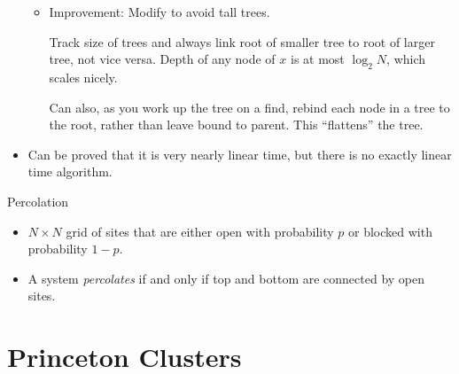 \documentclass[12pt]{article}
\theoremstyle{plain}
\theoremstyle{definition}
\theoremstyle{remark}
\begin{document}
\begin{itemize}
\begin{itemize}
      \item Improvement:
        Modify to avoid tall trees.

        Track size of trees and always link root of smaller tree to root
        of larger tree, not vice versa.
        Depth of any node of $x$ is at most $\log_2 N$, which scales
        nicely.

        Can also, as you work up the tree on a find, rebind each node in
        a tree to the root, rather than leave bound to parent.
        This ``flattens'' the tree.

    \end{itemize}
  \item Can be proved that it is very nearly linear time, but there is
    no exactly linear time algorithm.
\end{itemize}
Percolation
\begin{itemize}
  \item $N\times N$ grid of sites that are either open with probability
    $p$ or blocked with probability $1-p$.
  \item A system \emph{percolates} if and only if top and bottom are
    connected by open sites.
\end{itemize}



\clearpage
\appendix
\section{Princeton Clusters}
\end{document}
